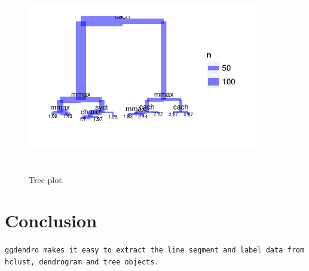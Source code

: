 \documentclass[a4paper]{article}
\newcommand{\ggdendro}{\tt ggdendro}
\begin{document}
\begin{figure}[h]
\begin{center}
{
\includegraphics[width=4in, height=3in]{ggdendro-tree1}
}
\end{center}
\caption{Tree plot}
\end{figure}


\section{Conclusion}

\ggdendro{} makes it easy to extract the line segment and label data from hclust, dendrogram and tree objects.


\end{document}
